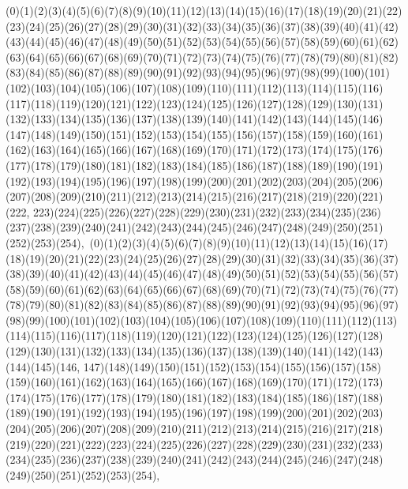 \documentclass[12pt]{article}
\begin{document}
{(0)(1)(2)(3)(4)(5)(6)(7)(8)(9)(10)(11)(12)(13)(14)(15)(16)(17)(18)(19)(20)(21)(22)(23)(24)(25)(26)(27)(28)(29)(30)(31)(32)(33)(34)(35)(36)(37)(38)(39)(40)(41)(42)(43)(44)(45)(46)(47)(48)(49)(50)(51)(52)(53)(54)(55)(56)(57)(58)(59)(60)(61)(62)(63)(64)(65)(66)(67)(68)(69)(70)(71)(72)(73)(74)(75)(76)(77)(78)(79)(80)(81)(82)(83)(84)(85)(86)(87)(88)(89)(90)(91)(92)(93)(94)(95)(96)(97)(98)(99)(100)(101)(102)(103)(104)(105)(106)(107)(108)(109)(110)(111)(112)(113)(114)(115)(116)(117)(118)(119)(120)(121)(122)(123)(124)(125)(126)(127)(128)(129)(130)(131)(132)(133)(134)(135)(136)(137)(138)(139)(140)(141)(142)(143)(144)(145)(146)(147)(148)(149)(150)(151)(152)(153)(154)(155)(156)(157)(158)(159)(160)(161)(162)(163)(164)(165)(166)(167)(168)(169)(170)(171)(172)(173)(174)(175)(176)(177)(178)(179)(180)(181)(182)(183)(184)(185)(186)(187)(188)(189)(190)(191)(192)(193)(194)(195)(196)(197)(198)(199)(200)(201)(202)(203)(204)(205)(206)(207)(208)(209)(210)(211)(212)(213)(214)(215)(216)(217)(218)(219)(220)(221)(222, 223)(224)(225)(226)(227)(228)(229)(230)(231)(232)(233)(234)(235)(236)(237)(238)(239)(240)(241)(242)(243)(244)(245)(246)(247)(248)(249)(250)(251)(252)(253)(254)$
, 
$
(0)(1)(2)(3)(4)(5)(6)(7)(8)(9)(10)(11)(12)(13)(14)(15)(16)(17)(18)(19)(20)(21)(22)(23)(24)(25)(26)(27)(28)(29)(30)(31)(32)(33)(34)(35)(36)(37)(38)(39)(40)(41)(42)(43)(44)(45)(46)(47)(48)(49)(50)(51)(52)(53)(54)(55)(56)(57)(58)(59)(60)(61)(62)(63)(64)(65)(66)(67)(68)(69)(70)(71)(72)(73)(74)(75)(76)(77)(78)(79)(80)(81)(82)(83)(84)(85)(86)(87)(88)(89)(90)(91)(92)(93)(94)(95)(96)(97)(98)(99)(100)(101)(102)(103)(104)(105)(106)(107)(108)(109)(110)(111)(112)(113)(114)(115)(116)(117)(118)(119)(120)(121)(122)(123)(124)(125)(126)(127)(128)(129)(130)(131)(132)(133)(134)(135)(136)(137)(138)(139)(140)(141)(142)(143)(144)(145)(146, 147)(148)(149)(150)(151)(152)(153)(154)(155)(156)(157)(158)(159)(160)(161)(162)(163)(164)(165)(166)(167)(168)(169)(170)(171)(172)(173)(174)(175)(176)(177)(178)(179)(180)(181)(182)(183)(184)(185)(186)(187)(188)(189)(190)(191)(192)(193)(194)(195)(196)(197)(198)(199)(200)(201)(202)(203)(204)(205)(206)(207)(208)(209)(210)(211)(212)(213)(214)(215)(216)(217)(218)(219)(220)(221)(222)(223)(224)(225)(226)(227)(228)(229)(230)(231)(232)(233)(234)(235)(236)(237)(238)(239)(240)(241)(242)(243)(244)(245)(246)(247)(248)(249)(250)(251)(252)(253)(254)$
, 
$
}
\end{document}
